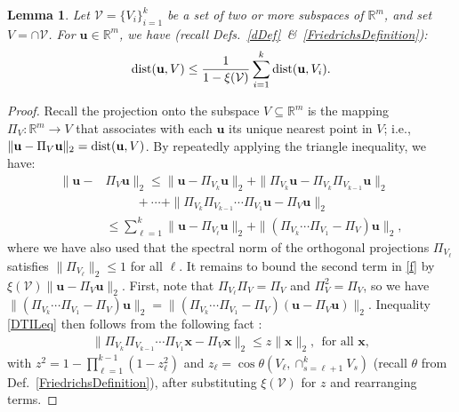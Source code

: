 \documentclass[journal, twocolumn]{IEEEtran}
\newtheorem{lemma}{Lemma}
\begin{document}
\begin{lemma}\label{DistanceToIntersectionLemma}
Let $\mathcal{V} = \{V_i\}_{i=1}^k$ be a set of two or more subspaces of $\mathbb{R}^m$, and set $V = \cap \mathcal{V} $. For  $\mathbf{u} \in \mathbb{R}^m$, we have (recall Defs.~\ref{dDef}~\&~\ref{FriedrichsDefinition}):
\begin{align}\label{DTILeq}
\text{\rm dist}(\mathbf{u}, V) \leq \frac{1}{1 - \xi(\mathcal{V})} \sum_{i=1}^k \text{\rm dist}(\mathbf{u}, V_i).
\end{align}
\end{lemma}
\begin{proof} 
Recall the projection onto the subspace $V \subseteq \mathbb{R}^m$ is the mapping $\Pi_V: \mathbb{R}^m \to V$ that associates with each $\mathbf{u}$ its unique nearest point in $V$; i.e., $\|\mathbf{u} - \Pi_V\mathbf{u}\|_2 = \text{\rm dist}(\mathbf{u}, V)$.
By repeatedly applying the triangle inequality, we have:
\begin{align}\label{f}
\|\mathbf{u} - &\Pi_V\mathbf{u}\|_2 
\leq \|\mathbf{u} - \Pi_{V_k} \mathbf{u}\|_2 + \|\Pi_{V_k}  \mathbf{u} - \Pi_{V_k}\Pi_{V_{k-1}}\mathbf{u}\|_2 \nonumber \\
&\ \ \ \ \ \ \ \ \ \ \ + \cdots + \|\Pi_{V_k} \Pi_{V_{k-1}}\cdots \Pi_{V_1} \mathbf{u} - \Pi_V \mathbf{u}\|_2 \nonumber \\
&\leq  \sum_{\ell=1}^k \|\mathbf{u} - \Pi_{V_{\ell}} \mathbf{u}\|_2 
+ \|(\Pi_{V_k}\cdots\Pi_{V_{1}} - \Pi_V) \mathbf{u}\|_2,
\end{align}
where we have also used that the spectral norm of the orthogonal projections $\Pi_{V_{\ell}}$ satisfies $\|\Pi_{V_{\ell}}\|_2 \leq 1$ for all $\ell$. It remains to bound the second term in \eqref{f} by $\xi(\mathcal{V}) \|\mathbf{u} - \Pi_V\mathbf{u}\|_2$. First, note that $\Pi_{V_\ell} \Pi_V = \Pi_V$ and $\Pi_V^2 = \Pi_V$, so we have $\|(\Pi_{V_k} \cdots \Pi_{V_1} - \Pi_V) \mathbf{u} \|_2 
= \| ( \Pi_{V_k} \cdots\Pi_{V_1} - \Pi_V ) (\mathbf{u} - \Pi_V\mathbf{u})\|_2$. %
Inequality \eqref{DTILeq} then follows from the following fact \cite[Thm.~9.33]{Deutsch12}:
\begin{align}
\|\Pi_{V_k}\Pi_{V_{k-1}}\cdots\Pi_{V_1} \mathbf{x} - \Pi_V\mathbf{x}\|_2 \leq z \|\mathbf{x}\|_2, \ \ \text{for all } \mathbf{x},
\end{align}
with \mbox{$z^2= 1 - \prod_{\ell =1}^{k-1}(1-z_{\ell}^2)$} and \mbox{$z_{\ell} = \cos\theta\left(V_{\ell}, \cap_{s=\ell+1}^k V_s\right)$} (recall $\theta$ from Def.~\ref{FriedrichsDefinition}), after substituting $\xi(\mathcal{V})$ for $z$ and rearranging terms.
\end{proof}
\end{document}
